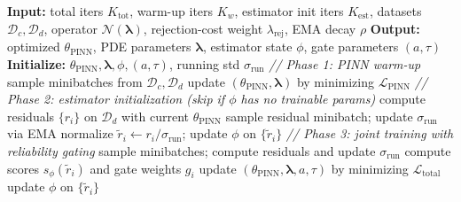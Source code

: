 \documentclass{article}
\theoremstyle{plain}
\theoremstyle{definition}
\theoremstyle{remark}
\begin{document}
\begin{algorithm}[t]
\caption{Noise-Adaptive PINN (naPINN)}
\label{alg:napinn}
\begin{algorithmic}[1]
\STATE \textbf{Input:} total iters $K_{\text{tot}}$, warm-up iters $K_{w}$,
estimator init iters $K_{\text{est}}$, datasets $\mathcal{D}_c, \mathcal{D}_d$,
operator $\mathcal{N}(\boldsymbol{\lambda})$, rejection-cost weight $\lambda_{\text{rej}}$,
EMA decay $\rho$
\STATE \textbf{Output:} optimized $\theta_\text{PINN}$, PDE parameters $\boldsymbol{\lambda}$, estimator state $\phi$, gate parameters $(a, \tau)$
\STATE \textbf{Initialize:} $\theta_\text{PINN}, \boldsymbol{\lambda}, \phi, (a,\tau)$, running std $\sigma_{\text{run}}$
\STATE \textit{// Phase 1: PINN warm-up}
    \STATE sample minibatches from $\mathcal{D}_c, \mathcal{D}_d$
    \STATE update $(\theta_\text{PINN}, \boldsymbol{\lambda})$ by minimizing $\mathcal{L}_{\text{PINN}}$ \hfill {}
\ENDFOR
\STATE \textit{// Phase 2: estimator initialization (skip if $\phi$ has no trainable params)}
\STATE compute residuals $\{r_i\}$ on $\mathcal{D}_d$ with current $\theta_\text{PINN}$
    \STATE sample residual minibatch; update $\sigma_{\text{run}}$ via EMA \hfill {}
    \STATE normalize $\tilde r_i \leftarrow r_i/\sigma_{\text{run}}$; update $\phi$ on $\{\tilde r_i\}$
\ENDFOR
\STATE \textit{// Phase 3: joint training with reliability gating}
    \STATE sample minibatches; compute residuals and update $\sigma_{\text{run}}$
    \STATE compute scores $s_\phi(\tilde r_i)$ and gate weights $g_i$ \hfill {}
    \STATE update $(\theta_\text{PINN}, \boldsymbol{\lambda}, a, \tau)$ by minimizing $\mathcal{L}_{\text{total}}$ \hfill {}
    \STATE update $\phi$ on $\{\tilde r_i\}$
\ENDFOR
\end{algorithmic}
\end{algorithm}
\end{document}
